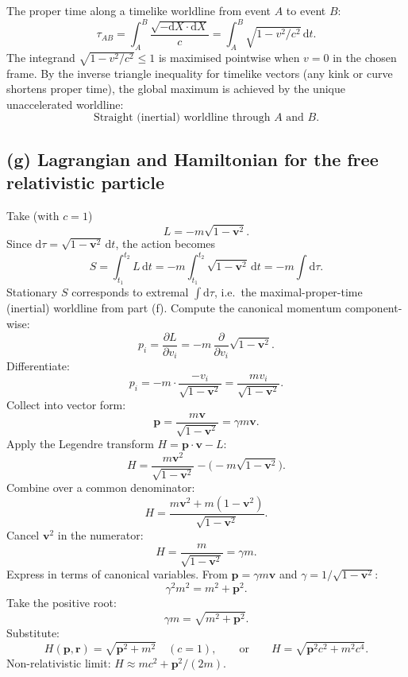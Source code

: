 \documentclass[11pt]{article}
\newcommand{\de}{\mathrm{d}}
\newcommand{\pd}[2]{\frac{\partial #1}{\partial #2}}
\begin{document}
The proper time along a timelike worldline from event $A$ to event $B$:
\[ \tau_{AB} = \int_A^B\frac{\sqrt{-\de X\cdot\de X}}{c} = \int_A^B \sqrt{1-v^2/c^2}\,\de t. \]
The integrand $\sqrt{1-v^2/c^2} \leq 1$ is maximised pointwise when $v=0$ in the chosen frame. By the inverse triangle inequality for timelike vectors (any kink or curve shortens proper time), the global maximum is achieved by the unique unaccelerated worldline:
\begin{equation}
\boxed{\text{Straight (inertial) worldline through } A\text{ and }B.}
\end{equation}

\subsection*{(g) Lagrangian and Hamiltonian for the free relativistic particle}

Take (with $c=1$)
\begin{equation}
L = -m\sqrt{1-\bm v^2}.
\end{equation}
Since $\de\tau = \sqrt{1-\bm v^2}\,\de t$, the action becomes
\[ S = \int_{t_1}^{t_2} L\,\de t = -m\int_{t_1}^{t_2}\sqrt{1-\bm v^2}\,\de t = -m\int\de\tau. \]
Stationary $S$ corresponds to extremal $\int\!\de\tau$, i.e.\ the maximal-proper-time (inertial) worldline from part (f). Compute the canonical momentum component-wise:
\[ p_i = \pd{L}{v_i} = -m\,\pd{}{v_i}\sqrt{1-\bm v^2}. \]
Differentiate:
\[ p_i = -m\cdot\frac{-v_i}{\sqrt{1-\bm v^2}} = \frac{m v_i}{\sqrt{1-\bm v^2}}. \]
Collect into vector form:
\[ \bm p = \frac{m\bm v}{\sqrt{1-\bm v^2}} = \gamma m\bm v. \]
Apply the Legendre transform $H = \bm p\cdot\bm v - L$:
\[ H = \frac{m\bm v^2}{\sqrt{1-\bm v^2}} - \bigl(-m\sqrt{1-\bm v^2}\bigr). \]
Combine over a common denominator:
\[ H = \frac{m\bm v^2 + m(1-\bm v^2)}{\sqrt{1-\bm v^2}}. \]
Cancel $\bm v^2$ in the numerator:
\[ H = \frac{m}{\sqrt{1-\bm v^2}} = \gamma m. \]
Express in terms of canonical variables. From $\bm p=\gamma m\bm v$ and $\gamma = 1/\sqrt{1-\bm v^2}$:
\[ \gamma^2 m^2 = m^2 + \bm p^2. \]
Take the positive root:
\[ \gamma m = \sqrt{m^2 + \bm p^2}. \]
Substitute:
\begin{equation}
\boxed{H(\bm p,\bm r) = \sqrt{\bm p^2 + m^2}\quad(c=1),\qquad \text{or}\qquad H = \sqrt{\bm p^2 c^2 + m^2 c^4}.}
\end{equation}
Non-relativistic limit: $H\approx mc^2 + \bm p^2/(2m)$.
\end{document}
